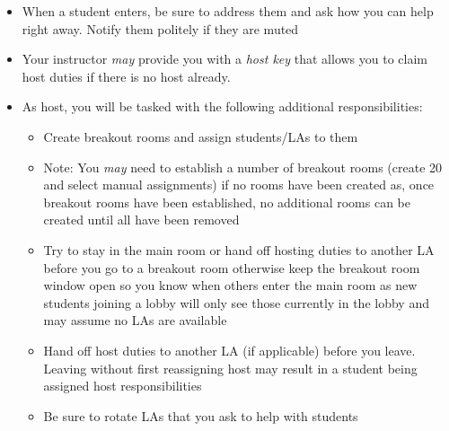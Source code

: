 \documentclass[12pt]{scrartcl}
\begin{document}
\begin{itemize}
  \item When a student enters, be sure to address them and ask how you can help right away.  Notify them politely if they are muted
  \item Your instructor \emph{may} provide you with a \emph{host key} that allows you to claim host duties if there is no host already.
  \item As host, you will be tasked with the following additional responsibilities:
  \begin{itemize}
    \item Create breakout rooms and assign students/LAs to them
    \item Note: You \emph{may} need to establish a number of breakout rooms (create 20 and select manual assignments) if no rooms have been created as, once breakout rooms have been established, no additional rooms can be created until all have been removed
    \item Try to stay in the main room or hand off hosting duties to another LA before you go to a breakout room otherwise keep the breakout room window open so you know when others enter the main room as new students joining a lobby will only see those currently in the lobby and may assume no LAs are available
    \item Hand off host duties to another LA (if applicable) before you leave. Leaving without first reassigning host may result in a student being assigned host responsibilities
    \item Be sure to rotate LAs that you ask to help with students
  \end{itemize}
\end{itemize}
\end{document}
